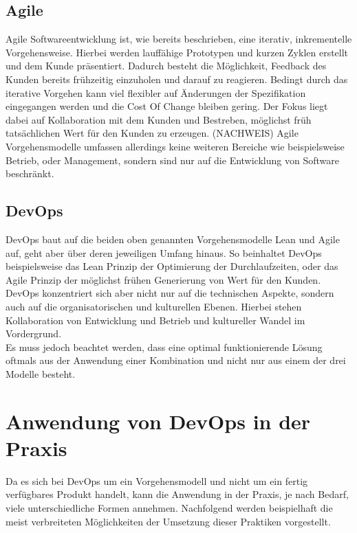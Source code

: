 \subsection{Agile}
Agile Softwareentwicklung ist, wie bereits beschrieben, eine iterativ, inkrementelle Vorgehensweise. Hierbei werden lauffähige Prototypen und kurzen Zyklen erstellt und dem Kunde präsentiert. Dadurch besteht die Möglichkeit, Feedback des Kunden bereits frühzeitig einzuholen und darauf zu reagieren. Bedingt durch das iterative Vorgehen kann viel flexibler auf Änderungen der Spezifikation eingegangen werden und die Cost Of Change bleiben gering. Der Fokus liegt dabei auf Kollaboration mit dem Kunden und Bestreben, möglichst früh tatsächlichen Wert für den Kunden zu erzeugen. (NACHWEIS) Agile Vorgehensmodelle umfassen allerdings keine weiteren Bereiche wie beispielsweise Betrieb, oder Management, sondern sind nur auf die Entwicklung von Software beschränkt.

\subsection{DevOps}
DevOps baut auf die beiden oben genannten Vorgehensmodelle Lean und Agile auf, geht aber über deren jeweiligen Umfang hinaus. So beinhaltet DevOps beispielsweise das Lean Prinzip der Optimierung der Durchlaufzeiten, oder das Agile Prinzip der möglichst frühen Generierung von Wert für den Kunden. DevOps konzentriert sich aber nicht nur auf die technischen Aspekte, sondern auch auf die organisatorischen und kulturellen Ebenen. Hierbei stehen Kollaboration von Entwicklung und Betrieb und kultureller Wandel im Vordergrund.\\
Es muss jedoch beachtet werden, dass eine optimal funktionierende Lösung oftmals aus der Anwendung einer Kombination und nicht nur aus einem der drei Modelle besteht.


\section{Anwendung von DevOps in der Praxis} %
Da es sich bei DevOps um ein Vorgehensmodell und nicht um ein fertig verfügbares Produkt handelt, kann die Anwendung in der Praxis, je nach Bedarf, viele unterschiedliche Formen annehmen. Nachfolgend werden beispielhaft die meist verbreiteten Möglichkeiten der Umsetzung dieser Praktiken vorgestellt.

